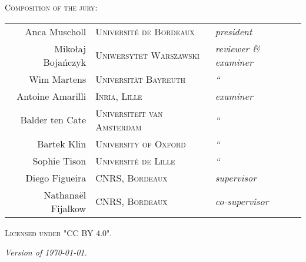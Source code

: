 \newpage
\thispagestyle{empty}
~
\newpage
\thispagestyle{empty}
\begin{fullwidth}
	\setlength{\parindent}{0pt}
	~\vfill
	\begin{center}
		\normalfont\Large\scshape Composition of the jury:\\[1.5em]
		\normalfont
		\begin{tabular}{r@{\hskip 1em}l@{\hskip 1em}l}
		  Anca Muscholl & \textsc{\small Université de Bordeaux} & \emph{president}\\[.5em]
		  Mikołaj Bojańczyk & \textsc{\small Uniwersytet Warszawski} & \emph{reviewer \& examiner}\\
		  Wim Martens & \textsc{\small Universität Bayreuth} & \emph{\hphantom{revi}``} \\[.5em]
		  Antoine Amarilli & \textsc{\small Inria, Lille} & \emph{examiner}\\
		  Balder ten Cate & \textsc{\small Universiteit van Amsterdam} & \emph{\hphantom{revi}``}\\
		  Bartek Klin & \textsc{\small University of Oxford} & \emph{\hphantom{revi}``}\\
		  Sophie Tison & \textsc{\small Université de Lille} & \emph{\hphantom{revi}``}\\[.5em]
		  Diego Figueira & \textsc{\small CNRS, Bordeaux} & \emph{supervisor}\\
		  Nathanaël Fijalkow & \textsc{\small CNRS, Bordeaux} & \emph{co-supervisor}
		\end{tabular}
	\end{center}

	\vfill

	\par\textsc{Licensed under "CC BY 4.0".}
	\par\textit{Version of \today.}
\end{fullwidth}